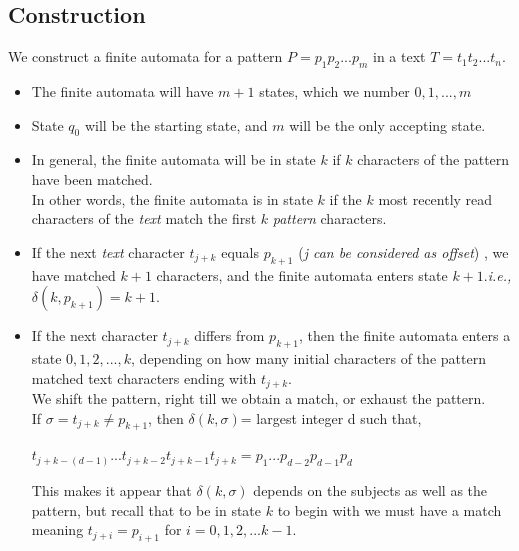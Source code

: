 \documentclass[12pt,a4paper]{article}%
\begin{document}
		\subsection{Construction}
		\begin{flushleft}
		We construct a finite automata for a pattern $P=p_{1}p_{2}...p_{m}$ in a text $T=t_{1}t_{2}...t_{n}$.
		\begin{itemize}
			\fontsize{12pt}{18pt}\selectfont
			\item{The finite automata will have $m+1$ states, which we number $0,1,...,m$}
			\item{State $q_0$ will be the starting state, and $m$ will be the only accepting state.}
			\item{In general, the finite automata will be in state $k$ if $k$ characters of the pattern have been matched.\\\smallskip 
			In other words, the finite automata is in state $k$ if the $k$ most recently read characters of the \textit{text} match the first $k$ \textit{pattern} characters.}
			\item{If the next \textit{text} character $t_{j+k}$ equals $p_{k+1}$ (\textit{j can be considered as offset}) , we have matched $k+1$ characters, and the finite automata enters state $k+1$.\textit{i.e.,} $\delta(k,p_{k+1})=k+1$.}
			\item{If the next character $t_{j+k}$ differs from $p_{k+1}$, then the finite automata enters a state $0,1,2,...,k$, depending on how many initial characters of the pattern matched text characters ending with $t_{j+k}$.\\\smallskip
			We shift the pattern, right till we obtain a match, or exhaust the pattern.\\\smallskip
			If $\sigma=t_{j+k}\neq p_{k+1}$, then $\delta(k,\sigma)$= largest integer d such that,\\\smallskip \begin{center}
				$t_{j+k-(d-1)} ... t_{j+k-2} t_{j+k-1} t_{j+k} = p_{1} ... p_{d-2} p_{d-1} p_{d}$
			\end{center}
			This makes it appear that $\delta(k,\sigma)$ depends on the subjects as well as the pattern, but recall that to be in state $k$ to begin with we must have a match meaning $t_{j+i}=p_{i+1}$ for $i=0,1,2,...k-1$. }
		
		\end{itemize}
		\pagebreak
		\end{flushleft}
\end{document}
